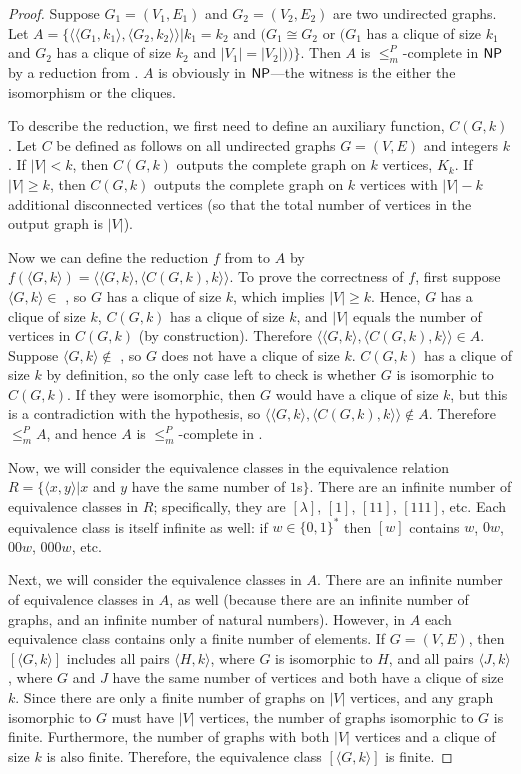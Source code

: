 \documentclass{article}
\theoremstyle{definition} \newtheorem{definition}[definition]{Definition}
\newcommand{\sigmastar}{\{0, 1\}^{*}} %
\newcommand{\mor}{\leq^{P}_{m}} %
\newcommand{\pair}[2]{\langle#1,#2\rangle} %
\begin{document}
\begin{proof}
  Suppose $G_1=(V_1, E_1)$ and $G_2=(V_2, E_2)$ are two undirected graphs.
  Let $A=\{\pair{\pair{G_1}{k_1}}{\pair{G_2}{k_2}}| k_1=k_2$ and $(G_1\cong G_2$ or $(G_1$ has a clique of size $k_1$ and $G_2$ has a clique of size $k_2$ and $|V_1|=|V_2|))\}$.
  Then $A$ is $\mor$-complete in ${\mathsf{NP}}$ by a reduction from .
  $A$ is obviously in ${\mathsf{NP}}$---the witness is the either the isomorphism or the cliques.
  
  To describe the reduction, we first need to define an auxiliary function, $C(G, k)$.
  Let $C$ be defined as follows on all undirected graphs $G=(V, E)$ and integers $k$.
  If $|V| < k$, then $C(G, k)$ outputs the complete graph on $k$ vertices, $K_k$.
  If $|V|\geq k$, then $C(G, k)$ outputs the complete graph on $k$ vertices with $|V|-k$ additional disconnected vertices (so that the total number of vertices in the output graph is $|V|$).

  Now we can define the reduction $f$ from  to $A$ by $f(\pair{G}{k})=\pair{\pair{G}{k}}{\pair{C(G, k)}{k}}$.
  To prove the correctness of $f$, first suppose $\pair{G}{k}\in$ , so $G$ has a clique of size $k$, which implies $|V|\geq k$.
  Hence, $G$ has a clique of size $k$, $C(G, k)$ has a clique of size $k$, and $|V|$ equals the number of vertices in $C(G, k)$ (by construction).
  Therefore $\pair{\pair{G}{k}}{\pair{C(G, k)}{k}}\in A$.
  Suppose $\pair{G}{k}\notin$ , so $G$ does not have a clique of size $k$.
  $C(G, k)$ has a clique of size $k$ by definition, so the only case left to check is whether $G$ is isomorphic to $C(G, k)$.
  If they were isomorphic, then $G$ would have a clique of size $k$, but this is a contradiction with the hypothesis, so $\pair{\pair{G}{k}}{\pair{C(G, k)}{k}}\notin A$.
  Therefore $\mor A$, and hence $A$ is $\mor$-complete in \NP.

  Now, we will consider the equivalence classes in the equivalence relation $R=\{\pair{x}{y}|x$ and $y$ have the same number of $1$s$\}$.
  There are an infinite number of equivalence classes in $R$; specifically, they are $[\lambda]$, $[1]$, $[11]$, $[111]$, etc.
  Each equivalence class is itself infinite as well: if $w\in\sigmastar$ then $[w]$ contains $w$, $0w$, $00w$, $000w$, etc.

  Next, we will consider the equivalence classes in $A$.
  There are an infinite number of equivalence classes in $A$, as well (because there are an infinite number of graphs, and an infinite number of natural numbers).
  However, in $A$ each equivalence class contains only a finite number of elements.
  If $G=(V,E)$, then $[\pair{G}{k}]$ includes all pairs $\pair{H}{k}$, where $G$ is isomorphic to $H$, and all pairs $\pair{J}{k}$, where $G$ and $J$ have the same number of vertices and both have a clique of size $k$.
  Since there are only a finite number of graphs on $|V|$ vertices, and any graph isomorphic to $G$ must have $|V|$ vertices, the number of graphs isomorphic to $G$ is finite.
  Furthermore, the number of graphs with both $|V|$ vertices and a clique of size $k$ is also finite.
  Therefore, the equivalence class $[\pair{G}{k}]$ is finite.


\end{proof}
\end{document}
